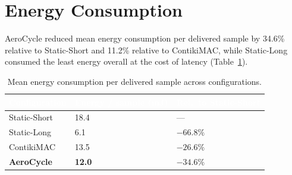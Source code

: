 \section{Energy Consumption}
AeroCycle reduced mean energy consumption per delivered sample by 34.6\% relative to
Static-Short and 11.2\% relative to ContikiMAC, while Static-Long consumed the least energy
overall at the cost of latency (Table~\ref{tab:energy}).

\begin{table}[H]
\centering
\caption{Mean energy consumption per delivered sample across configurations.}
\label{tab:energy}
\begin{tabularx}{\textwidth}{@{}lXX@{}}
\toprule
\rowcolor{nustgreen}
\textcolor{white}{\bfseries Configuration} & \textcolor{white}{\bfseries Energy / sample (mJ)} &
\textcolor{white}{\bfseries Rel.\ to Static-Short} \\
\midrule
Static-Short & 18.4 & --- \\
\rowcolor{nustmist}
Static-Long  & 6.1  & $-66.8\%$ \\
ContikiMAC   & 13.5 & $-26.6\%$ \\
\rowcolor{nustmist}
\textbf{AeroCycle} & \textbf{12.0} & \textbf{$-34.6\%$} \\
\bottomrule
\end{tabularx}
\end{table}
